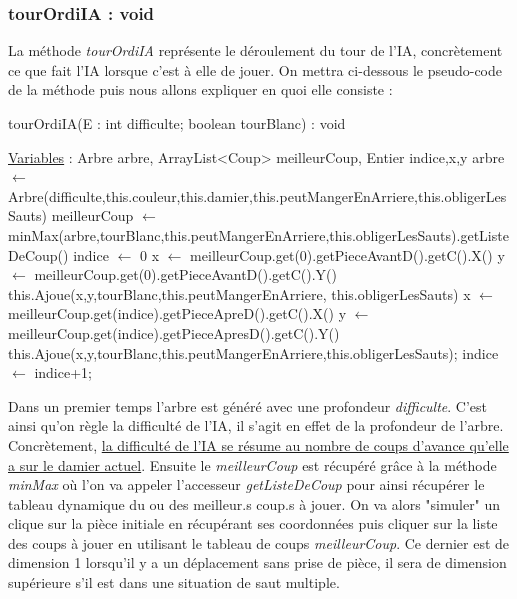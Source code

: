 \documentclass[12,french]{report}
\begin{document}
\subsubsection{tourOrdiIA : void}

La méthode \textit{tourOrdiIA} représente le déroulement du tour de l'IA, concrètement ce que fait l'IA lorsque c'est à elle de jouer. On mettra ci-dessous le pseudo-code de la méthode puis nous allons expliquer en quoi elle consiste :

\begin{algorithm}
	\caption{tourOrdiIA(E : int difficulte; boolean tourBlanc) : void}
	\begin{algorithmic}
	\State \underline{Variables} : Arbre arbre, ArrayList<Coup> meilleurCoup, Entier indice,x,y
	\State
	\State arbre $\leftarrow$ Arbre(difficulte,this.couleur,this.damier,this.peutMangerEnArriere,this.obligerLesSauts)
	\State meilleurCoup $\leftarrow$ minMax(arbre,tourBlanc,this.peutMangerEnArriere,this.obligerLesSauts).getListeDeCoup()
	\State indice $\leftarrow$ 0
	\State x $\leftarrow$ meilleurCoup.get(0).getPieceAvantD().getC().X()
	\State y $\leftarrow$ meilleurCoup.get(0).getPieceAvantD().getC().Y()
	\State this.Ajoue(x,y,tourBlanc,this.peutMangerEnArriere, this.obligerLesSauts)
	\State x $\leftarrow$ meilleurCoup.get(indice).getPieceApreD().getC().X()
	\State y $\leftarrow$ meilleurCoup.get(indice).getPieceApresD().getC().Y()
	\State this.Ajoue(x,y,tourBlanc,this.peutMangerEnArriere,this.obligerLesSauts);
	\State indice $\leftarrow$ indice+1;
	\EndWhile
	\end{algorithmic}
\end{algorithm}\vspace{0.4cm}

Dans un premier temps l'arbre est généré avec une profondeur \textit{difficulte}. C'est ainsi qu'on règle la difficulté de l'IA, il s'agit en effet de la profondeur de l'arbre. Concrètement, \uline{la difficulté de l'IA se résume au nombre de coups d'avance qu'elle a sur le damier actuel}. Ensuite le \textit{meilleurCoup} est récupéré grâce à la méthode \textit{minMax} où l'on va appeler l'accesseur \textit{getListeDeCoup} pour ainsi récupérer le tableau dynamique du ou des meilleur.s coup.s à jouer. On va alors "simuler" un clique sur la pièce initiale en récupérant ses coordonnées puis cliquer sur la liste des coups à jouer en utilisant le tableau de coups \textit{meilleurCoup}. Ce dernier est de dimension 1 lorsqu'il y a un déplacement sans prise de pièce, il sera de dimension supérieure s'il est dans une situation de saut multiple.
\end{document}
